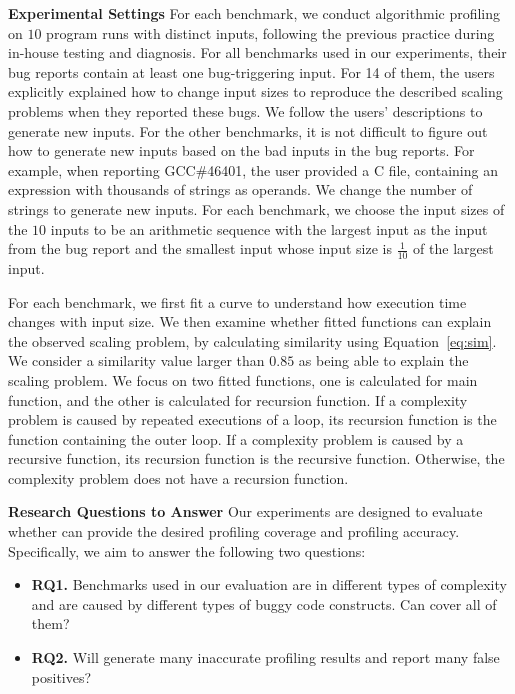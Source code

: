 

\textbf{Experimental Settings}
For each benchmark, 
we conduct algorithmic profiling on $10$ program runs with distinct inputs, 
following the previous practice during in-house 
testing and diagnosis\cite{SongOOPSLA2014,joy.asplos13}.
For all benchmarks used in our experiments,
their bug reports contain at least one bug-triggering input. 
For 14 of them, 
the users explicitly explained how to change input sizes to 
reproduce the described scaling problems when they reported these bugs. 
We follow the users' 
descriptions to generate new inputs.
For the other benchmarks, 
it is not difficult to figure out how to generate new inputs based 
on the bad inputs in the bug reports. 
For example, when reporting GCC\#46401, 
the user provided a C file, 
containing an expression with thousands of strings as operands. 
We change the number of strings to generate new inputs.
For each benchmark, we choose the input sizes of the $10$ inputs to be 
an arithmetic sequence with the largest input as the input from the bug report 
and the smallest input whose input size is 
$\frac{1}{10}$ of the largest input.

For each benchmark, we first fit a curve to understand how execution 
time changes with input size. 
We then examine whether fitted functions can explain the observed scaling problem, 
by calculating similarity using Equation~\ref{eq:sim}. 
We consider a similarity value larger than $0.85$ as being able to explain the scaling problem. 
We focus on two fitted functions, one is calculated for main function, 
and the other is calculated for recursion function. 
If a complexity problem is caused by repeated executions of a loop,
its recursion function is the function containing the outer loop.
If a complexity problem is caused by a recursive function, 
its recursion function is the recursive function. 
Otherwise, the complexity problem does not have a recursion function. 


\textbf{Research Questions to Answer}
Our experiments are designed to evaluate whether \Tool can provide the desired profiling coverage 
and profiling accuracy. 
Specifically, we aim to answer the following two questions:

\begin{itemize}

\item {\bf RQ1.} 
Benchmarks used in our evaluation are in different types of complexity and 
are caused by different types of buggy code constructs. 
Can \Tool cover all of them? 
 
\item {\bf RQ2.}
Will \Tool generate many inaccurate profiling results and report many false positives? 

\end{itemize}

